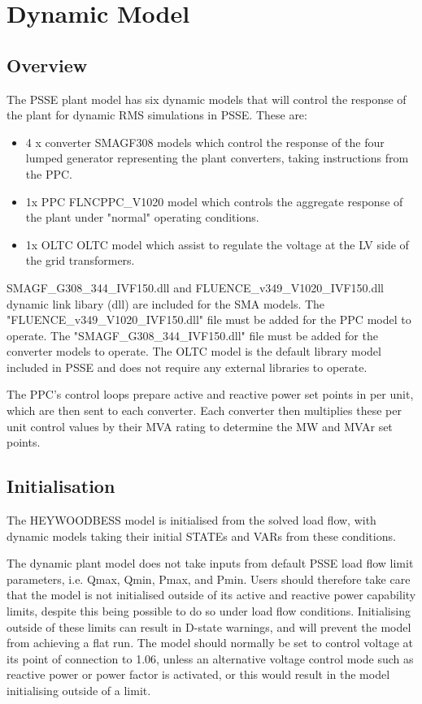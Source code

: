 \documentclass{../grid-link-report}
\begin{document}
	\chapter{Dynamic Model}
	
	\section{Overview}
	
	
	The PSSE plant model has six dynamic models that will control the response of the plant for dynamic RMS simulations in PSSE. These are:
	
	\begin{itemize}
		\item 4 x converter SMAGF308 models which control the response of the four lumped generator representing the plant converters, taking instructions from the \ac{PPC}.
		\item 1x PPC FLNCPPC_V1020 model which controls the aggregate response of the plant under "normal" operating conditions.
		\item 1x OLTC \ac{OLTC} model which assist to regulate the voltage at the LV side of the grid transformers.
	\end{itemize}
	
	SMAGF_G308_344_IVF150.dll and FLUENCE_v349_V1020_IVF150.dll dynamic link libary (dll) are included for the SMA models. The "FLUENCE_v349_V1020_IVF150.dll" file must be added for the PPC model to operate. The "SMAGF_G308_344_IVF150.dll" file must be added for the converter models to operate. The OLTC model is the default library model included in PSSE and does not require any external libraries to operate.

	
	The \ac{PPC}'s control loops prepare active and reactive power set points in per unit, which are then sent to each converter. Each converter then multiplies these per unit control values by their MVA rating to determine the MW and MVAr set points.
	
	\section{Initialisation}
	
	The HEYWOODBESS model is initialised from the solved load flow, with dynamic models taking their initial STATEs and VARs from these conditions.
	
	The dynamic plant model does not take inputs from default PSSE load flow limit parameters, i.e. Qmax, Qmin, Pmax, and Pmin. Users should therefore take care that the model is not initialised outside of its active and reactive power capability limits, despite this being possible to do so under load flow conditions. Initialising outside of these limits can result in D-state warnings, and will prevent the model from achieving a flat run. The model should normally be set to control voltage at its point of connection to 1.06, unless an alternative voltage control mode such as reactive power or power factor is activated, or this would result in the model initialising outside of a limit.
	
\end{document}
